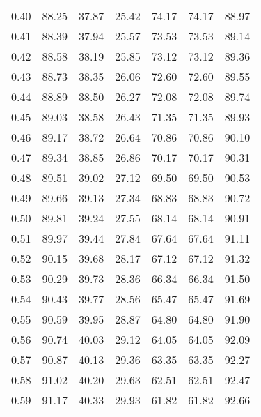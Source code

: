 \begin{tabular}{|c|c|c|c|c|c|c|}
      0.40 &     88.25 &     37.87 &      25.42 &   74.17 &      74.17 &         88.97 \\
      0.41 &     88.39 &     37.94 &      25.57 &   73.53 &      73.53 &         89.14 \\
      0.42 &     88.58 &     38.19 &      25.85 &   73.12 &      73.12 &         89.36 \\
      0.43 &     88.73 &     38.35 &      26.06 &   72.60 &      72.60 &         89.55 \\
      0.44 &     88.89 &     38.50 &      26.27 &   72.08 &      72.08 &         89.74 \\
      0.45 &     89.03 &     38.58 &      26.43 &   71.35 &      71.35 &         89.93 \\
      0.46 &     89.17 &     38.72 &      26.64 &   70.86 &      70.86 &         90.10 \\
      0.47 &     89.34 &     38.85 &      26.86 &   70.17 &      70.17 &         90.31 \\
      0.48 &     89.51 &     39.02 &      27.12 &   69.50 &      69.50 &         90.53 \\
      0.49 &     89.66 &     39.13 &      27.34 &   68.83 &      68.83 &         90.72 \\
      0.50 &     89.81 &     39.24 &      27.55 &   68.14 &      68.14 &         90.91 \\
      0.51 &     89.97 &     39.44 &      27.84 &   67.64 &      67.64 &         91.11 \\
      0.52 &     90.15 &     39.68 &      28.17 &   67.12 &      67.12 &         91.32 \\
      0.53 &     90.29 &     39.73 &      28.36 &   66.34 &      66.34 &         91.50 \\
      0.54 &     90.43 &     39.77 &      28.56 &   65.47 &      65.47 &         91.69 \\
      0.55 &     90.59 &     39.95 &      28.87 &   64.80 &      64.80 &         91.90 \\
      0.56 &     90.74 &     40.03 &      29.12 &   64.05 &      64.05 &         92.09 \\
      0.57 &     90.87 &     40.13 &      29.36 &   63.35 &      63.35 &         92.27 \\
      0.58 &     91.02 &     40.20 &      29.63 &   62.51 &      62.51 &         92.47 \\
      0.59 &     91.17 &     40.33 &      29.93 &   61.82 &      61.82 &         92.66 \\

\end{tabular}
